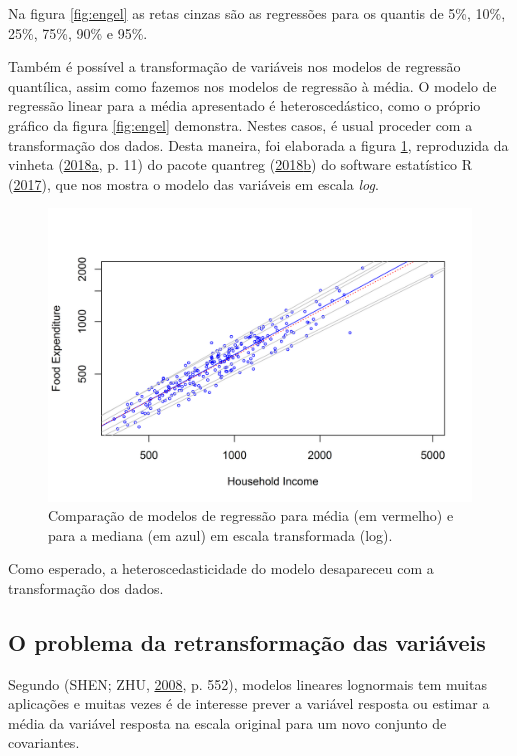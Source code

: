 \documentclass[a4paper]{article}
\newcommand{\pkg}[1]{{\normalfont\fontseries{b}\selectfont #1}}
\let\proglang=\textsf
\begin{document}
Na figura \ref{fig:engel} as retas cinzas são as regressões para os
quantis de 5\%, 10\%, 25\%, 75\%, 90\% e 95\%.

Também é possível a transformação de variáveis nos modelos de regressão
quantílica, assim como fazemos nos modelos de regressão à média. O
modelo de regressão linear para a média apresentado é heteroscedástico,
como o próprio gráfico da figura \ref{fig:engel} demonstra. Nestes
casos, é usual proceder com a transformação dos dados. Desta maneira,
foi elaborada a figura \ref{fig:engellog}, reproduzida da vinheta
(\protect\hyperlink{ref-quantregvignette}{2018}\protect\hyperlink{ref-quantregvignette}{a},
p. 11) do pacote \pkg{quantreg}
(\protect\hyperlink{ref-quantreg}{2018}\protect\hyperlink{ref-quantreg}{b})
do software estatístico \proglang{R} (\protect\hyperlink{ref-R}{2017}),
que nos mostra o modelo das variáveis em escala \emph{log}.

\begin{figure}[H]

{\centering \includegraphics[width=0.7\linewidth]{images/engellog-1} 

}

\caption{Comparação de modelos de regressão para média (em vermelho) e para a mediana (em azul) em escala transformada (log).}\label{fig:engellog}
\end{figure}

Como esperado, a heteroscedasticidade do modelo desapareceu com a
transformação dos dados.

\subsection{O problema da retransformação das
variáveis}\label{o-problema-da-retransformacao-das-variaveis}

Segundo (SHEN; ZHU, \protect\hyperlink{ref-shen}{2008}, p. 552), modelos
lineares lognormais tem muitas aplicações e muitas vezes é de interesse
prever a variável resposta ou estimar a média da variável resposta na
escala original para um novo conjunto de covariantes.
\end{document}
